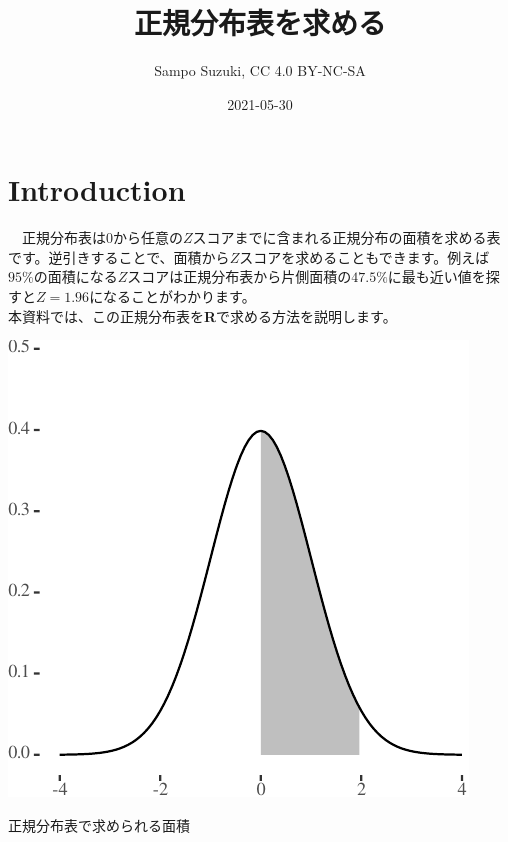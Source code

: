 \documentclass[]{tufte-handout}
\title[正規分布表を求める]{正規分布表を求める}
\author{Sampo Suzuki, CC 4.0 BY-NC-SA}
\date{2021-05-30}
\begin{document}
\maketitle




\hypertarget{introduction}{%
\section{\texorpdfstring{\textbf{Introduction}}{Introduction}}\label{introduction}}

　正規分布表は\(0\)から任意の\(Z\)スコアまでに含まれる正規分布の面積を求める表です。逆引きすることで、面積から\(Z\)スコアを求めることもできます。例えば\(95\%\)の面積になる\(Z\)スコアは正規分布表から片側面積の\(47.5\%\)に最も近い値を探すと\(Z = 1.96\)になることがわかります。\\
本資料では、この正規分布表を\textbf{R}で求める方法を説明します。

\begin{marginfigure}

{\centering \includegraphics{NormTable_files/figure-latex/unnamed-chunk-1-1} 

}

\caption[正規分布表で求められる面積]{正規分布表で求められる面積}\label{fig:unnamed-chunk-1}
\end{marginfigure}

　
\end{document}
